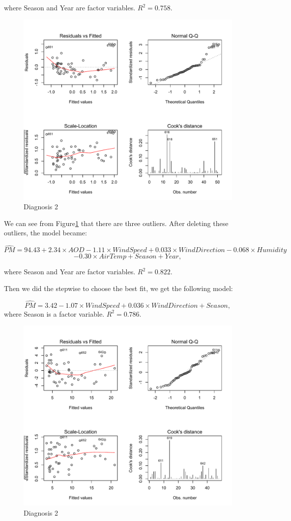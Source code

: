 \documentclass[10pt]{article}
\begin{document}
where Season and Year are factor variables. $R^2 = 0.758$.

\begin{figure}[ht!]
\centering
\includegraphics[width = 0.7\linewidth]{residual.pdf}
\caption{Diagnosis 2}
\label{d1}
\end{figure}

We can see from Figure\ref{d1} that there are three outliers. After deleting these outliers, the model became:

$$\hat{PM} = 94.43 + 2.34\times AOD - 1.11\times WindSpeed + 0.033\times WindDirection - 0.068\times Humidity $$
$$- 0.30\times AirTemp + Season + Year, $$

where Season and Year are factor variables. $R^2 = 0.822$.

Then we did the stepwise to choose the best fit, we get the following model:

$$\hat{PM} = 3.42 -1.07\times WindSpeed + 0.036\times WindDirection + Season, $$
where Season is a factor variable. $R^2 = 0.786$.

\begin{figure}[ht!]
\centering
\includegraphics[width = 0.7\linewidth]{residual2.pdf}
\caption{Diagnosis 2}
\label{d2}
\end{figure}
\end{document}
